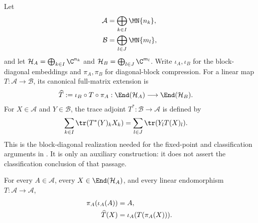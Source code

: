 \begin{definition}%
    \label{def:direct_sum_full_matrix_extension}
    \leanok
    Let
    \begin{align}
        \mathcal A
        &=\bigoplus_{k\in I}\MN{n_k}, \notag\\
        \mathcal B
        &=\bigoplus_{l\in J}\MN{m_l},
        \notag
    \end{align}
    and let $\mathcal H_A=\bigoplus_{k\in I}\C^{n_k}$ and
    $\mathcal H_B=\bigoplus_{l\in J}\C^{m_l}$. Write
    $\iota_A,\iota_B$ for the block-diagonal embeddings and
    $\pi_A,\pi_B$ for diagonal-block compression. For a linear map
    $T:\mathcal A\to\mathcal B$, its canonical full-matrix extension is
    \begin{align}
        \widehat T
        &:=\iota_B\circ T\circ\pi_A:
          \End(\mathcal H_A)\longrightarrow\End(\mathcal H_B).
        \label{eq:spectral_direct_sum_extension}
    \end{align}
    For $X\in\mathcal A$ and $Y\in\mathcal B$, the trace adjoint
    $T^*:\mathcal B\to\mathcal A$ is defined by
    \begin{align}
        \sum_{k\in I}\tr(T^*(Y)_kX_k)
        &=\sum_{l\in J}\tr(Y_lT(X)_l).
        \label{eq:spectral_direct_sum_adjoint}
    \end{align}
    This is the block-diagonal realization needed for the fixed-point and
    classification arguments in
    \cite[Appendix~C.4, lines~1980--2003]{Cirac2016MPDO_arXiv}. It is only
    an auxiliary construction: it does not assert the classification
    conclusion of that passage.
\end{definition}

\begin{theorem}
    \label{thm:direct_sum_extension_embedding_compression}
    \leanok
    For every $A\in\mathcal A$, every $X\in\End(\mathcal H_A)$, and every
    linear endomorphism $T:\mathcal A\to\mathcal A$,
    \begin{align}
        \pi_A(\iota_A(A))
        &=A, \notag\\
        \widehat T(X)
        &=\iota_A(T(\pi_A(X))).
        \notag
    \end{align}
\end{theorem}

